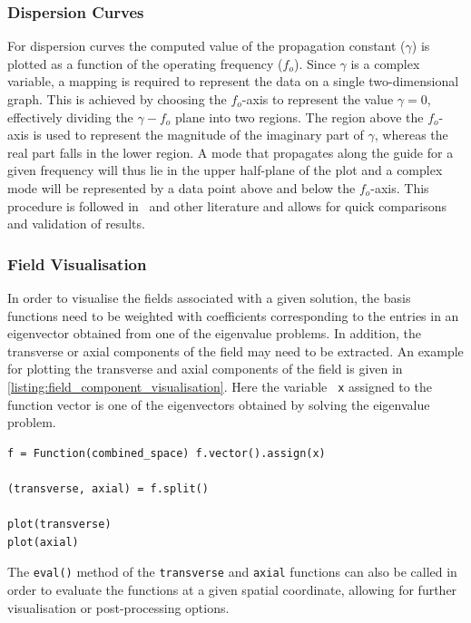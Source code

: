 \subsubsection{Dispersion Curves}

For dispersion curves the computed value of the propagation constant
($\gamma$) is plotted as a function of the operating frequency
($f_o$).  Since $\gamma$ is a complex variable, a mapping is required
to represent the data on a single two-dimensional graph. This is
achieved by choosing the $f_o$-axis to represent the value $\gamma =
0$, effectively dividing the {$\gamma-f_o$} plane into two
regions. The region above the $f_o$-axis is used to represent the
magnitude of the imaginary part of $\gamma$, whereas the real part
falls in the lower region. A mode that propagates along the guide for
a given frequency will thus lie in the upper half-plane of the plot
and a complex mode will be represented by a data point above and below
the $f_o$-axis.  This procedure is followed in~\cite{PelCoc1998} and
other literature and allows for quick comparisons and validation of
results.

\subsubsection{Field Visualisation}

In order to visualise the fields associated with a given solution, the
basis functions need to be weighted with coefficients corresponding to
the entries in an eigenvector obtained from one of the eigenvalue
problems. In addition, the transverse or axial components of the field
may need to be extracted. An example for plotting the transverse and
axial components of the field is given in \lstlistingname{}
\ref{listing:field_component_visualisation}.  Here the variable {\tt
x} assigned to the function vector is one of the eigenvectors obtained
by solving the eigenvalue problem.

\begin{lstlisting}[float=h, caption=Extraction and visualisation of transverse and axial field components., label=listing:field_component_visualisation]
f = Function(combined_space) f.vector().assign(x)

(transverse, axial) = f.split()

plot(transverse)
plot(axial)
\end{lstlisting}

The {\tt eval()} method of the {\tt transverse} and {\tt axial}
functions can also be called in order to evaluate the functions at a
given spatial coordinate, allowing for further visualisation or
post-processing options.

